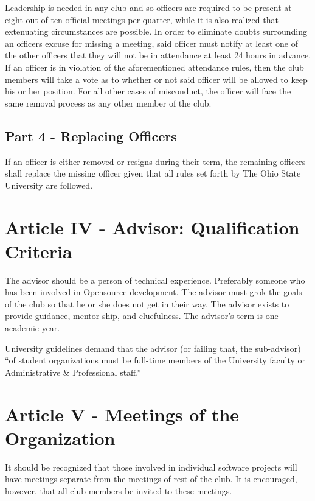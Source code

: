 \documentclass{article}
\begin{document}
	Leadership is needed in any club and so officers are required to be
present at eight out of ten official meetings per quarter, while it is also
realized that extenuating circumstances are possible.  In order to eliminate
doubts surrounding an officers excuse for missing a meeting, said officer
must notify at least one of the other officers that they will not be in
attendance at least 24 hours in advance.  If an officer is in violation of
the aforementioned attendance rules, then the club members will take a vote
as to whether or not said officer will be allowed to keep his or her
position. For all other cases of misconduct, the officer will face the same
removal process as any other member of the club.

	\subsection{Part 4 - Replacing Officers}

	If an officer is either removed or resigns during their term, the remaining officers shall replace the missing officer given that all rules set forth by The Ohio State University are followed.

	\section{Article IV - Advisor: Qualification Criteria}

	The advisor should be a person of technical experience. Preferably someone who has been involved in Opensource development. The advisor must grok the goals of the club so that he or she does not get in their way. The advisor exists to provide guidance, mentor-ship, and cluefulness. The advisor's term is one academic year.

	University guidelines demand that the advisor (or failing that, the sub-advisor) ``of student organizations must be full-time members of the University faculty or Administrative \& Professional staff.''

	\section{Article V - Meetings of the Organization}

	It should be recognized that those involved in individual software projects will have meetings separate from the meetings of rest of the club. It is encouraged, however, that all club members be invited to these meetings.
\end{document}
